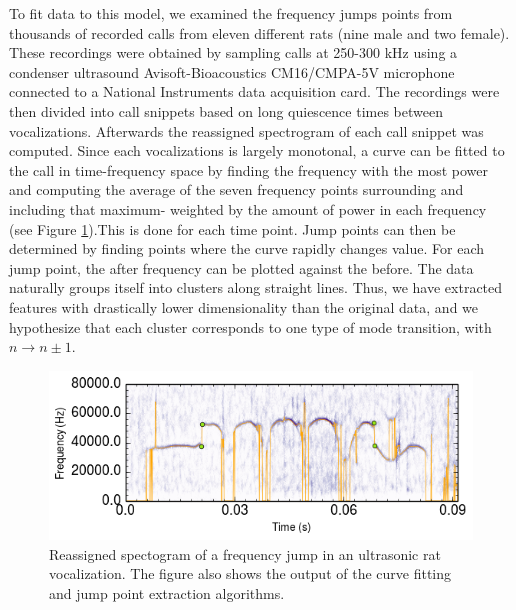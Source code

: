 \documentclass[twocolumn, prX]{revtex4}
\begin{document}
To fit data to this model, we examined the frequency jumps points
from thousands of recorded calls from eleven different rats (nine male and two female). These recordings were obtained by sampling calls at 250-300 kHz using a condenser ultrasound Avisoft-Bioacoustics CM16/CMPA-5V microphone connected to a National Instruments data acquisition card. The recordings were then divided into call snippets based on long quiescence times between vocalizations. Afterwards the reassigned spectrogram of each call snippet was computed. Since each vocalizations is largely monotonal, a curve can be fitted to the call in time-frequency space by finding the frequency with the most power and computing the average of the seven frequency points surrounding and including that maximum- weighted by the amount of power in each frequency (see Figure \ref{fig:specgram}).This is done for each time point. Jump points can then be determined by finding points where the curve rapidly changes value. For each jump point, the after frequency can be plotted against the before. The data naturally groups itself into clusters along straight lines. Thus, we have extracted features with drastically lower dimensionality than the original data, and we hypothesize that each cluster corresponds to one type of mode transition, with $n\rightarrow n\pm1$. 
\begin{figure}
\begin{center}
\includegraphics[width=\columnwidth]{specgram.png}
\caption{\label{fig:specgram} Reassigned spectogram of a frequency jump in an ultrasonic rat vocalization. The figure also shows the output of the curve fitting and jump point extraction algorithms.}
\end{center} 
\end{figure}
\end{document}
